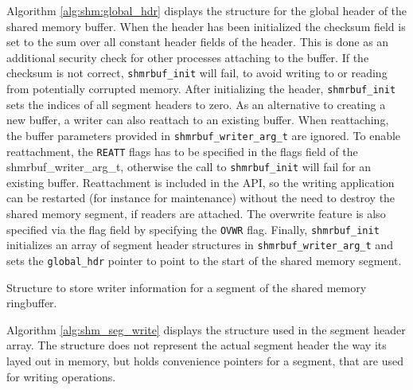 Algorithm \ref{alg:shm:global_hdr} displays the structure for the global header of the shared memory buffer. When the header has been initialized
the checksum field is set to the sum over all constant header fields of the header. This is done as an additional security check for other processes attaching to the buffer. 
If the checksum is not correct, \texttt{shmrbuf\_init} will fail, to avoid writing to or reading from potentially corrupted memory. After initializing the header,
\texttt{shmrbuf\_init} sets the indices of all segment headers to zero. As an alternative to creating a new buffer,
a writer can also reattach to an existing buffer. When reattaching, the buffer parameters provided in \texttt{shmrbuf\_writer\_arg\_t} are ignored. To enable reattachment, the \texttt{REATT} flags has to be specified in the flags field of the shmrbuf\_writer\_arg\_t, otherwise the call   
to \texttt{shmrbuf\_init} will fail for an existing buffer. Reattachment is included in the API, so the writing application can be restarted (for instance for maintenance) without the need to
destroy the shared memory segment, if readers are attached. The overwrite feature is also specified via the flag field by specifying the \texttt{OVWR} flag.
Finally, \texttt{shmrbuf\_init} initializes an array of segment header structures in \texttt{shmrbuf\_writer\_arg\_t} and sets the \texttt{global\_hdr} pointer to point to the start of the shared memory segment.

\begin{algorithm}[h!]
    
    \label{alg:shm_seg_write}
    \caption[Shared Memory Ringbuffer: Writer Segment Header]{Structure to store writer information for a segment of the shared memory ringbuffer.}
\end{algorithm}
Algorithm \ref{alg:shm_seg_write} displays the structure  used in the segment header array. The structure does not represent the actual segment header the way its layed out in memory, but holds convenience pointers for a segment, that are used for writing operations.   
   
